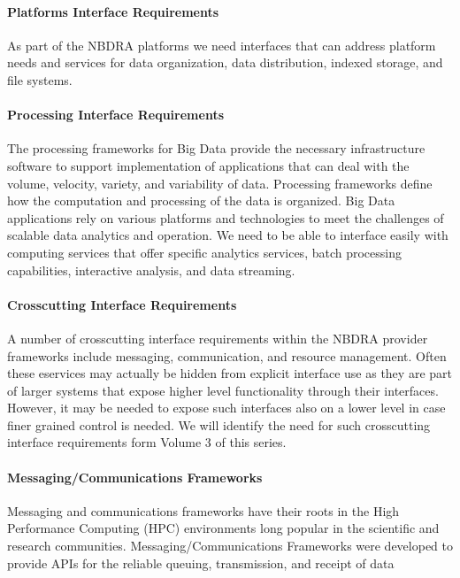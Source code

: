 \documentclass[10pt]{article}
\begin{document}
\paragraph{Platforms Interface Requirements}

As part of the NBDRA platforms we need interfaces that can address platform needs and services for data organization, data distribution, indexed storage, and file systems.

\paragraph{Processing Interface Requirements}

The processing frameworks for Big Data provide the necessary infrastructure software to support implementation of applications that can deal with the volume, velocity, variety, and variability of data. Processing frameworks define how the computation and processing of the data is organized. Big Data applications rely on various platforms and technologies to meet the challenges of scalable data analytics and operation. 
We need to be able to interface easily with computing services that offer specific analytics services, batch processing capabilities, interactive analysis, and data streaming.

\paragraph{Crosscutting Interface Requirements}

A number of crosscutting interface requirements within the NBDRA provider frameworks include messaging, communication, and resource management. Often these eservices may actually be hidden from explicit interface use as they are part of larger systems that expose higher level functionality through their interfaces. However, it may be needed to expose such interfaces also on a lower level in case finer grained control is needed. We will identify the need for such crosscutting interface requirements form Volume 3 of this series.

\paragraph{Messaging/Communications Frameworks}

Messaging and communications frameworks have their roots in the High Performance Computing (HPC) environments long popular in the scientific and research communities. Messaging/Communications Frameworks were developed to provide APIs for the reliable queuing, transmission, and receipt of data
\end{document}
